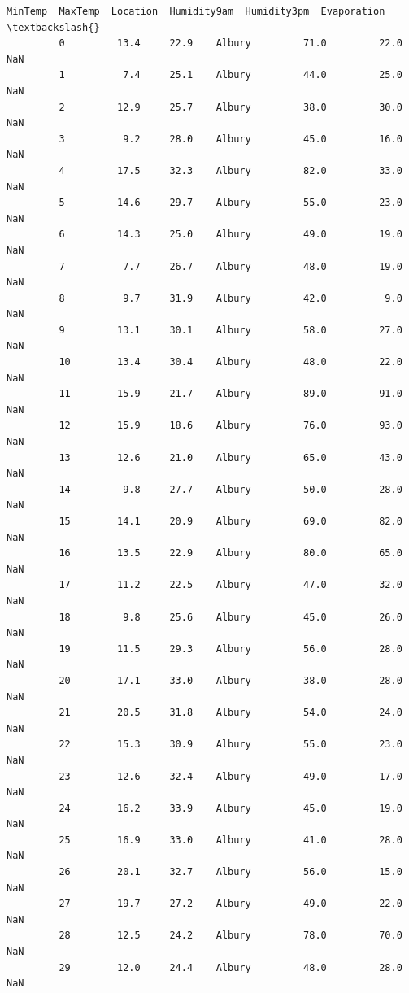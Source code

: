 \documentclass[11pt]{article}
\begin{document}
\begin{Verbatim}[commandchars=\\\{\}]
                MinTemp  MaxTemp  Location  Humidity9am  Humidity3pm  Evaporation  \textbackslash{}
         0         13.4     22.9    Albury         71.0         22.0          NaN   
         1          7.4     25.1    Albury         44.0         25.0          NaN   
         2         12.9     25.7    Albury         38.0         30.0          NaN   
         3          9.2     28.0    Albury         45.0         16.0          NaN   
         4         17.5     32.3    Albury         82.0         33.0          NaN   
         5         14.6     29.7    Albury         55.0         23.0          NaN   
         6         14.3     25.0    Albury         49.0         19.0          NaN   
         7          7.7     26.7    Albury         48.0         19.0          NaN   
         8          9.7     31.9    Albury         42.0          9.0          NaN   
         9         13.1     30.1    Albury         58.0         27.0          NaN   
         10        13.4     30.4    Albury         48.0         22.0          NaN   
         11        15.9     21.7    Albury         89.0         91.0          NaN   
         12        15.9     18.6    Albury         76.0         93.0          NaN   
         13        12.6     21.0    Albury         65.0         43.0          NaN   
         14         9.8     27.7    Albury         50.0         28.0          NaN   
         15        14.1     20.9    Albury         69.0         82.0          NaN   
         16        13.5     22.9    Albury         80.0         65.0          NaN   
         17        11.2     22.5    Albury         47.0         32.0          NaN   
         18         9.8     25.6    Albury         45.0         26.0          NaN   
         19        11.5     29.3    Albury         56.0         28.0          NaN   
         20        17.1     33.0    Albury         38.0         28.0          NaN   
         21        20.5     31.8    Albury         54.0         24.0          NaN   
         22        15.3     30.9    Albury         55.0         23.0          NaN   
         23        12.6     32.4    Albury         49.0         17.0          NaN   
         24        16.2     33.9    Albury         45.0         19.0          NaN   
         25        16.9     33.0    Albury         41.0         28.0          NaN   
         26        20.1     32.7    Albury         56.0         15.0          NaN   
         27        19.7     27.2    Albury         49.0         22.0          NaN   
         28        12.5     24.2    Albury         78.0         70.0          NaN   
         29        12.0     24.4    Albury         48.0         28.0          NaN   

\end{Verbatim}
\end{document}
